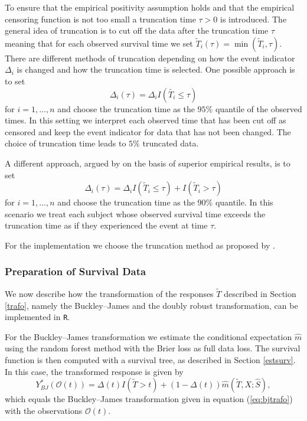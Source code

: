 \documentclass[12pt, a4paper]{scrartcl}
\theoremstyle{definition}
\theoremstyle{plain}
\numberwithin{equation}{section}
\numberwithin{figure}{section}
\numberwithin{table}{section}
\begin{document}
	To ensure that the empirical positivity assumption holds and that the empirical censoring function is not too small a truncation time $\tau>0$ is introduced.
	The general idea of truncation is to cut off the data after the truncation time $\tau$ meaning that for each observed survival time we set $\tilde{T}_i(\tau)=\min(\tilde{T}_i, \tau)$.
	There are different methods of truncation depending on how the event indicator $\Delta_i$ is changed and how the truncation time is selected.
	One possible approach is to set $$\Delta_i(\tau) = \Delta_i I(\tilde{T_i} \leq \tau)$$  for $i=1,\dots,n$ and choose the truncation time as the $95\%$ quantile of the observed times.
	In this setting we interpret each observed time that has been cut off as censored and keep the event indicator for data that has not been changed.
	The choice of truncation time leads to $5\%$ truncated data.
	
	A different approach, argued by \citet*{drtrees} on the basis of superior empirical results, is to set $$\Delta_i(\tau) = \Delta_i I(\tilde{T}_i\leq \tau) + I(\tilde{T}_i > \tau)$$ for $i=1,\dots,n$ and choose the truncation time as the $90\%$ quantile.
	In this scenario we treat each subject whose observed survival time exceeds the truncation time as if they experienced the event at time $\tau$.
	
	For the implementation we choose the truncation method as proposed by \citet*{drtrees}.
	\subsubsection{Preparation of Survival Data}\label{sim:trafo}
	
	We now describe how the transformation of the responses $\tilde T$ described in Section \ref{trafo}, namely the Buckley--James and the doubly robust transformation, can be implemented in \texttt{R}.
	
	For the Buckley--James transformation we estimate the conditional expectation $\hat{m}$ using the random forest method with the Brier loss as full data loss.
	The survival function is then computed with a survival tree, as described in Section \ref{estsurv}.
	In this case, the transformed response is given by
	\begin{equation*}
	Y^*_{BJ}(\mathcal{O}(t)) = \Delta(t)I(\tilde T>t)+ (1-\Delta(t))\hat{m}(\tilde T, X; \hat{S}),
	\end{equation*}
	which equals the Buckley--James transformation given in equation (\ref{eq:bjtrafo}) with the observations $\mathcal{O}(t)$.
	
\end{document}
